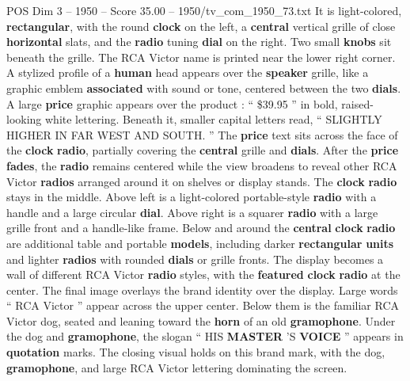 \begin{textsample}{POS Dim 3 – 1950 – Score 35.00 – 1950/tv\_com\_1950\_73.txt}
It is light-colored, \textbf{rectangular}, with the round \textbf{clock} on the left, a \textbf{central} vertical grille of close \textbf{horizontal} slats, and the \textbf{radio} tuning \textbf{dial} on the right.
Two small \textbf{knobs} sit beneath the grille.
The RCA Victor name is printed near the lower right corner.
A stylized profile of a \textbf{human} head appears over the \textbf{speaker} grille, like a graphic emblem \textbf{associated} with sound or tone, centered between the two \textbf{dials}.
A large \textbf{price} graphic appears over the product : “ \$39.95 ” in bold, raised-looking white lettering.
Beneath it, smaller capital letters read, “ SLIGHTLY HIGHER IN FAR WEST AND SOUTH. ” The \textbf{price} text sits across the face of the \textbf{clock} \textbf{radio}, partially covering the \textbf{central} grille and \textbf{dials}.
After the \textbf{price} \textbf{fades}, the \textbf{radio} remains centered while the view broadens to reveal other RCA Victor \textbf{radios} arranged around it on shelves or display stands.
The \textbf{clock} \textbf{radio} stays in the middle.
Above left is a light-colored portable-style \textbf{radio} with a handle and a large circular \textbf{dial}.
Above right is a squarer \textbf{radio} with a large grille front and a handle-like frame.
Below and around the \textbf{central} \textbf{clock} \textbf{radio} are additional table and portable \textbf{models}, including darker \textbf{rectangular} \textbf{units} and lighter \textbf{radios} with rounded \textbf{dials} or grille fronts.
The display becomes a wall of different RCA Victor \textbf{radio} styles, with the \textbf{featured} \textbf{clock} \textbf{radio} at the center.
The final image overlays the brand identity over the display.
Large words “ RCA Victor ” appear across the upper center.
Below them is the familiar RCA Victor dog, seated and leaning toward the \textbf{horn} of an old \textbf{gramophone}.
Under the dog and \textbf{gramophone}, the slogan “ HIS \textbf{MASTER} ’S \textbf{VOICE} ” appears in \textbf{quotation} marks.
The closing visual holds on this brand mark, with the dog, \textbf{gramophone}, and large RCA Victor lettering dominating the screen.

\end{textsample}
